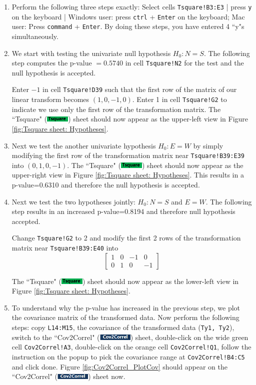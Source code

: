 \documentclass[article]{jss}
\numberwithin{equation}{subsection}
\newcommand{\shtTsquare}{``Tsquare" (\includegraphics[height=8pt, keepaspectratio=true]{TsquareSheetTab_png}) }
\newcommand{\shtCovCorrel}{``Cov2Correl" (\includegraphics[height=8pt, keepaspectratio=true]{Cov2CorrelSheetTab_png}) }
\begin{document}
        \begin{enumerate}
        	\item Perform the following three steps exactly: Select cells \texttt{Tsquare!B3:E3} | press \texttt{y} on the keyboard | Windows user: press \texttt{ctrl} + \texttt{Enter} on the keyboard; Mac user: Press \texttt{command} + \texttt{Enter}. By doing these steps, you have entered 4 ``y"s simultaneously.
        	
        	\item We start with testing the univariate null hypothesis $H_0: N = S$. The following step computes the p-value $=0.5740$ in cell \texttt{Tsquare!N2} for the test and the null hypothesis is accepted.
        	
        	Enter $-1$ in cell \texttt{Tsquare!D39} such that the first row of the matrix of our linear transform becomes $(1,0,-1,0)$. Enter 1 in cell \texttt{Tsquare!G2} to indicate we use only the first row of the transformation matrix. The \shtTsquare sheet should now appear as the upper-left view in Figure \ref{fig:Tsquare sheet: Hypotheses}.
        	
        	\item Next we test the another univariate hypothesis $H_0: E = W$ by simply modifying the first row of the transformation matrix near \texttt{Tsquare!B39:E39} into $(0,1,0,-1)$. The \shtTsquare sheet should now appear as the upper-right view in Figure \ref{fig:Tsquare sheet: Hypotheses}. This results in a p-value=0.6310 and therefore the null hypothesis is accepted.
        	
        	
        	\item Next we test the two hypotheses jointly: $H_0: N=S$ and $E=W$. The following step results in an increased p-value=0.8194 and therefore null hypothesis accepted.
        	
        	Change \texttt{Tsquare!G2} to 2 and modify the first 2 rows of the transformation matrix near \texttt{Tsquare!B39:E40} into 
        	\[\left[ {\begin{array}{*{20}{c}}
        		1&0&-1&0 \\ 
        		0&1&0&-1
        		\end{array}} \right]\]
        	
        	
        	The \shtTsquare sheet should now appear as the lower-left view in Figure \ref{fig:Tsquare sheet: Hypotheses}.
        	
        	\item To understand why the p-value has increased in the previous step, we plot the covariance matrix of the transformed data. Now perform the following steps: copy \texttt{L14:M15}, the covariance of the transformed data (\texttt{Ty1, Ty2}), switch to the \shtCovCorrel sheet, double-click on the wide green cell \texttt{Cov2Correl!A3}, double-click on the orange cell \texttt{Cov2Correl!Q1}, follow the instruction on the popup to pick the covariance range at \texttt{Cov2Correl!B4:C5} and click done. Figure \ref{fig:Cov2Correl_PlotCov} should appear on the \shtCovCorrel sheet now.
        	

\end{enumerate}
\end{document}
